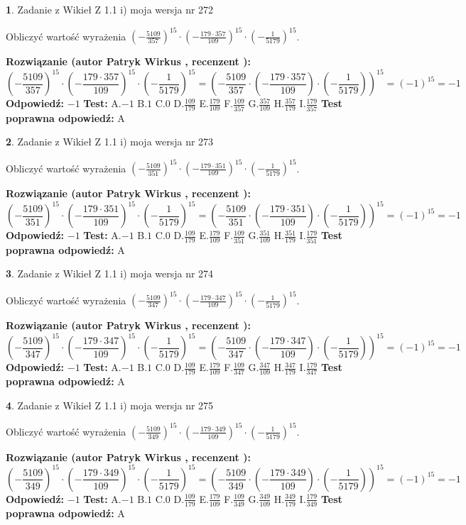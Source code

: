 \documentclass[12pt, a4paper]{article}
\theoremstyle{definition} %
\newtheorem{zad}{}
\newcommand{\zadStart}[1]{\begin{zad}#1\newline}
\newcommand{\zadStop}{\end{zad}}
\newcommand{\rozwStart}[2]{\noindent \textbf{Rozwiązanie (autor #1 , recenzent #2): }\newline}
\newcommand{\rozwStop}{\newline}
\newcommand{\odpStart}{\noindent \textbf{Odpowiedź:}\newline}
\newcommand{\odpStop}{\newline}
\newcommand{\testStart}{\noindent \textbf{Test:}\newline}
\newcommand{\testStop}{\newline}
\newcommand{\kluczStart}{\noindent \textbf{Test poprawna odpowiedź:}\newline}
\newcommand{\kluczStop}{\newline}
\begin{document}
\zadStart{Zadanie z Wikieł Z 1.1 i) moja wersja nr 272}

Obliczyć wartość wyrażenia $(-\frac{5109}{357})^{15} \cdot (-\frac{179 \cdot 357}{109})^{15} \cdot (-\frac{1}{5179})^{15}$.
\zadStop
\rozwStart{Patryk Wirkus}{}
$$(-\frac{5109}{357})^{15} \cdot (-\frac{179 \cdot 357}{109})^{15} \cdot (-\frac{1}{5179})^{15} = (-\frac{5109}{357} \cdot (-\frac{179 \cdot 357}{109}) \cdot (-\frac{1}{5179}))^{15} = (-1)^{15} = -1$$
\rozwStop
\odpStart
$-1$
\odpStop
\testStart
A.$-1$ B.$1$ C.$0$ D.$\frac{109}{179}$ E.$\frac{179}{109}$
F.$\frac{109}{357}$ G.$\frac{357}{109}$
H.$\frac{357}{179}$
I.$\frac{179}{357}$
\testStop
\kluczStart
A
\kluczStop



\zadStart{Zadanie z Wikieł Z 1.1 i) moja wersja nr 273}

Obliczyć wartość wyrażenia $(-\frac{5109}{351})^{15} \cdot (-\frac{179 \cdot 351}{109})^{15} \cdot (-\frac{1}{5179})^{15}$.
\zadStop
\rozwStart{Patryk Wirkus}{}
$$(-\frac{5109}{351})^{15} \cdot (-\frac{179 \cdot 351}{109})^{15} \cdot (-\frac{1}{5179})^{15} = (-\frac{5109}{351} \cdot (-\frac{179 \cdot 351}{109}) \cdot (-\frac{1}{5179}))^{15} = (-1)^{15} = -1$$
\rozwStop
\odpStart
$-1$
\odpStop
\testStart
A.$-1$ B.$1$ C.$0$ D.$\frac{109}{179}$ E.$\frac{179}{109}$
F.$\frac{109}{351}$ G.$\frac{351}{109}$
H.$\frac{351}{179}$
I.$\frac{179}{351}$
\testStop
\kluczStart
A
\kluczStop



\zadStart{Zadanie z Wikieł Z 1.1 i) moja wersja nr 274}

Obliczyć wartość wyrażenia $(-\frac{5109}{347})^{15} \cdot (-\frac{179 \cdot 347}{109})^{15} \cdot (-\frac{1}{5179})^{15}$.
\zadStop
\rozwStart{Patryk Wirkus}{}
$$(-\frac{5109}{347})^{15} \cdot (-\frac{179 \cdot 347}{109})^{15} \cdot (-\frac{1}{5179})^{15} = (-\frac{5109}{347} \cdot (-\frac{179 \cdot 347}{109}) \cdot (-\frac{1}{5179}))^{15} = (-1)^{15} = -1$$
\rozwStop
\odpStart
$-1$
\odpStop
\testStart
A.$-1$ B.$1$ C.$0$ D.$\frac{109}{179}$ E.$\frac{179}{109}$
F.$\frac{109}{347}$ G.$\frac{347}{109}$
H.$\frac{347}{179}$
I.$\frac{179}{347}$
\testStop
\kluczStart
A
\kluczStop



\zadStart{Zadanie z Wikieł Z 1.1 i) moja wersja nr 275}

Obliczyć wartość wyrażenia $(-\frac{5109}{349})^{15} \cdot (-\frac{179 \cdot 349}{109})^{15} \cdot (-\frac{1}{5179})^{15}$.
\zadStop
\rozwStart{Patryk Wirkus}{}
$$(-\frac{5109}{349})^{15} \cdot (-\frac{179 \cdot 349}{109})^{15} \cdot (-\frac{1}{5179})^{15} = (-\frac{5109}{349} \cdot (-\frac{179 \cdot 349}{109}) \cdot (-\frac{1}{5179}))^{15} = (-1)^{15} = -1$$
\rozwStop
\odpStart
$-1$
\odpStop
\testStart
A.$-1$ B.$1$ C.$0$ D.$\frac{109}{179}$ E.$\frac{179}{109}$
F.$\frac{109}{349}$ G.$\frac{349}{109}$
H.$\frac{349}{179}$
I.$\frac{179}{349}$
\testStop
\kluczStart
A
\kluczStop
\end{document}
